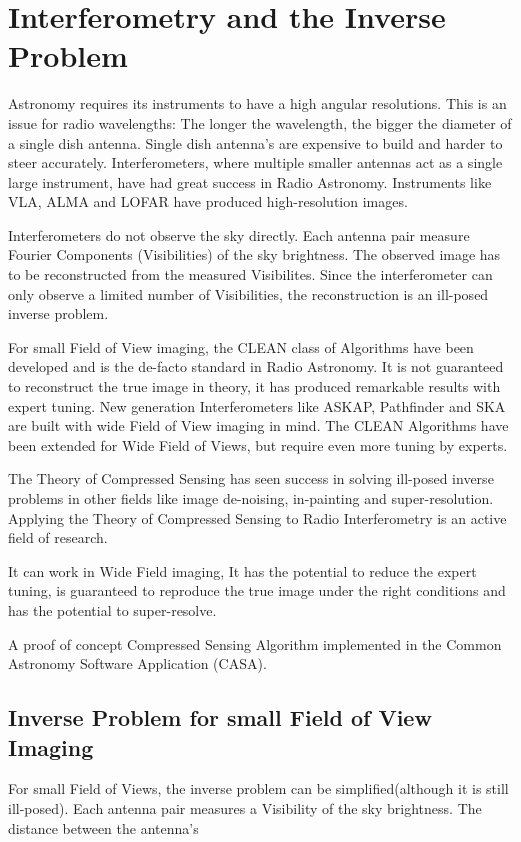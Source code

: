 \section{Interferometry and the Inverse Problem}\label{intro}
Astronomy requires its instruments to have a high angular resolutions. This is an issue for radio wavelengths: The longer the wavelength, the bigger the diameter of a single dish antenna. Single dish antenna's are expensive to build and harder to steer accurately. Interferometers, where multiple smaller antennas act as a single large instrument, have had great success in Radio Astronomy. Instruments like VLA, ALMA and LOFAR have produced high-resolution images. 

Interferometers do not observe the sky directly. Each antenna pair measure Fourier Components (Visibilities) of the sky brightness. The observed image has to be reconstructed from the measured Visibilites. Since the interferometer can only observe a limited number of Visibilities, the reconstruction is an ill-posed inverse problem.

For small Field of View imaging, the CLEAN class of Algorithms\cite{many} have been developed and is the de-facto standard in Radio Astronomy. It is not guaranteed to reconstruct the true image in theory, it has produced remarkable results with expert tuning. New generation Interferometers like ASKAP, Pathfinder and SKA are built with wide Field of View imaging in mind. The CLEAN Algorithms have been extended for Wide Field of Views, but require even more tuning by experts. 

The Theory of Compressed Sensing\cite{many} has seen success in solving ill-posed inverse problems in other fields like image de-noising\cite{many}, in-painting\cite{many} and super-resolution\cite{many}. Applying the Theory of Compressed Sensing to Radio Interferometry is an active field of research. 

It can work in Wide Field imaging, It has the potential to reduce the expert tuning, is guaranteed to reproduce the true image under the right conditions and has the potential to super-resolve.

A proof of concept Compressed Sensing Algorithm implemented in the Common Astronomy Software Application (CASA).

\subsection{Inverse Problem for small Field of View Imaging}
For small Field of Views, the inverse problem can be simplified(although it is still ill-posed). Each antenna pair measures a Visibility of the sky brightness. The distance between the antenna's 



